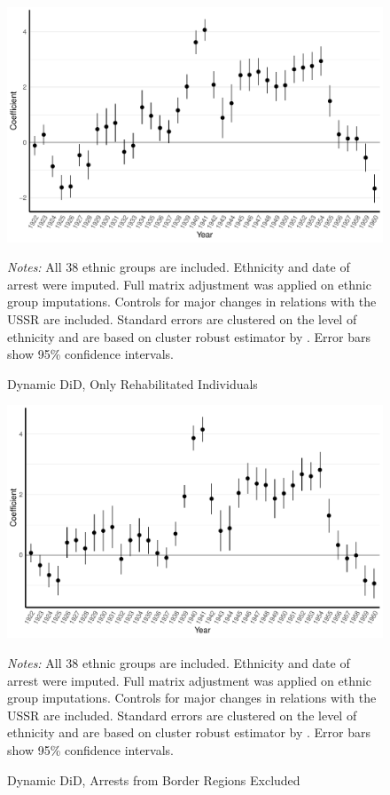  \begin{figure}[H]
\centering
\caption{Dynamic DiD, Only Rehabilitated Individuals}
\includegraphics[width=\textwidth]{plots/final/fmla_pred_full_imp_date_no_trends_geopol_rehab_cr2.pdf}
\begin{minipage}{0.92\textwidth}
\footnotesize
\emph{Notes:} All 38 ethnic groups are included. Ethnicity and date of arrest were imputed.  Full matrix adjustment was applied on ethnic group imputations. Controls for major changes in relations with the USSR are included.
Standard errors are clustered on the level of ethnicity and are based on cluster robust estimator by \citet{pustejovsky_small-sample_2018}. Error bars show 95\% confidence intervals. 
\end{minipage}
\label{fig:did_effects_rehabs}
\end{figure}

 \begin{figure}[H]
\centering
\caption{Dynamic DiD, Arrests from Border Regions Excluded}
\includegraphics[width=\textwidth]{plots/final/point_range_robust_cr2_border_provinces.pdf}
\begin{minipage}{0.92\textwidth}
\footnotesize
\emph{Notes:} All 38 ethnic groups are included. Ethnicity and date of arrest were imputed.  Full matrix adjustment was applied on ethnic group imputations. Controls for major changes in relations with the USSR are included.
Standard errors are clustered on the level of ethnicity and are based on cluster robust estimator by \citet{pustejovsky_small-sample_2018}. Error bars show 95\% confidence intervals. 
\end{minipage}
\label{fig:did_effects_border}
\end{figure}

